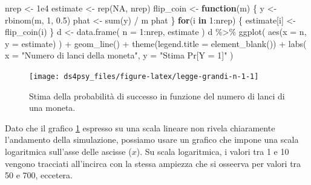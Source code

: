 \documentclass[
  11pt,
]{krantz}
\makeatletter
\newenvironment{Shaded}{\begin{snugshade}}{\end{snugshade}}
\newcommand{\AttributeTok}[1]{\textcolor[rgb]{0.61,0.61,0.61}{#1}}
\newcommand{\ConstantTok}[1]{\textcolor[rgb]{0,0,0}{#1}}
\newcommand{\ControlFlowTok}[1]{\textcolor[rgb]{0.27,0.27,0.27}{\textbf{#1}}}
\newcommand{\DecValTok}[1]{\textcolor[rgb]{0.06,0.06,0.06}{#1}}
\newcommand{\FloatTok}[1]{\textcolor[rgb]{0.06,0.06,0.06}{#1}}
\newcommand{\FunctionTok}[1]{\textcolor[rgb]{0,0,0}{#1}}
\newcommand{\NormalTok}[1]{#1}
\newcommand{\OtherTok}[1]{\textcolor[rgb]{0.37,0.37,0.37}{#1}}
\newcommand{\SpecialCharTok}[1]{\textcolor[rgb]{0,0,0}{#1}}
\newcommand{\StringTok}[1]{\textcolor[rgb]{0.5,0.5,0.5}{#1}}
\newenvironment{kframe}{%
\medskip{}
\setlength{\fboxsep}{.8em}
 \def\at@end@of@kframe{}%
 \ifinner\ifhmode%
  \def\at@end@of@kframe{\end{minipage}}%
  \begin{minipage}{\columnwidth}%
 \fi\fi%
 \def\FrameCommand##1{\hskip\@totalleftmargin \hskip-\fboxsep
 \colorbox{shadecolor}{##1}\hskip-\fboxsep
     \hskip-\linewidth \hskip-\@totalleftmargin \hskip\columnwidth}%
 \MakeFramed {\advance\hsize-\width
   \@totalleftmargin\z@ \linewidth\hsize
   \@setminipage}}%
 {\par\unskip\endMakeFramed%
 \at@end@of@kframe}
\renewenvironment{Shaded}{\begin{kframe}}{\end{kframe}}
\theoremstyle{definition}
\theoremstyle{definition}
\theoremstyle{definition}
\theoremstyle{definition}
\theoremstyle{remark}
\makeatother
\begin{document}
\begin{Shaded}
\begin{Highlighting}[]
\NormalTok{nrep }\OtherTok{\textless{}{-}} \FloatTok{1e4}
\NormalTok{estimate }\OtherTok{\textless{}{-}} \FunctionTok{rep}\NormalTok{(}\ConstantTok{NA}\NormalTok{, nrep)}
\NormalTok{flip\_coin }\OtherTok{\textless{}{-}} \ControlFlowTok{function}\NormalTok{(m) \{}
\NormalTok{  y }\OtherTok{\textless{}{-}} \FunctionTok{rbinom}\NormalTok{(m, }\DecValTok{1}\NormalTok{, }\FloatTok{0.5}\NormalTok{)}
\NormalTok{  phat }\OtherTok{\textless{}{-}} \FunctionTok{sum}\NormalTok{(y) }\SpecialCharTok{/}\NormalTok{ m}
\NormalTok{  phat}
\NormalTok{\}}
\ControlFlowTok{for}\NormalTok{(i }\ControlFlowTok{in} \DecValTok{1}\SpecialCharTok{:}\NormalTok{nrep) \{}
\NormalTok{  estimate[i] }\OtherTok{\textless{}{-}} \FunctionTok{flip\_coin}\NormalTok{(i)}
\NormalTok{\}}
\NormalTok{d }\OtherTok{\textless{}{-}} \FunctionTok{data.frame}\NormalTok{(}
  \AttributeTok{n =} \DecValTok{1}\SpecialCharTok{:}\NormalTok{nrep, }
\NormalTok{  estimate}
\NormalTok{)}
\NormalTok{d }\SpecialCharTok{\%\textgreater{}\%} 
  \FunctionTok{ggplot}\NormalTok{(}
    \FunctionTok{aes}\NormalTok{(}\AttributeTok{x =}\NormalTok{ n, }\AttributeTok{y =}\NormalTok{ estimate)}
\NormalTok{  ) }\SpecialCharTok{+}
  \FunctionTok{geom\_line}\NormalTok{() }\SpecialCharTok{+}
  \FunctionTok{theme}\NormalTok{(}\AttributeTok{legend.title =} \FunctionTok{element\_blank}\NormalTok{()) }\SpecialCharTok{+}
  \FunctionTok{labs}\NormalTok{(}
    \AttributeTok{x =} \StringTok{"Numero di lanci della moneta"}\NormalTok{, }
    \AttributeTok{y =} \StringTok{"Stima Pr[Y = 1]"}
\NormalTok{)}
\end{Highlighting}
\end{Shaded}

\begin{figure}[h]

{\centering \texttt{[image: ds4psy\_files/figure-latex/legge-grandi-n-1-1]} 

}

\caption{Stima della probabilità di successo in funzione del numero di lanci di una moneta.}\label{fig:legge-grandi-n-1}
\end{figure}

Dato che il grafico \ref{fig:legge-grandi-n-1} espresso su una scala lineare non rivela chiaramente l'andamento della simulazione, possiamo usare un grafico che impone una scala logaritmica sull'asse delle ascisse (\(x\)). Su scala logaritmica, i valori tra 1 e 10 vengono tracciati all'incirca con la stessa ampiezza che si osseerva per valori tra 50 e 700, eccetera.
\end{document}
